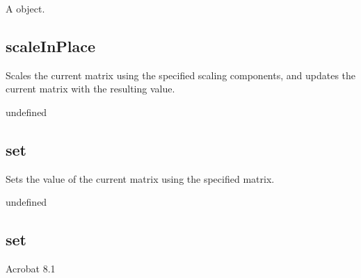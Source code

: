 \documentclass[letterpaper,12pt,english,openany,oneside]{sphinxmanual}
\begin{document}
\label{\detokenize{JS_3D_API:section-59}}\label{\detokenize{JS_3D_API:returns-54}}

A  object.


\subsection{scaleInPlace}
\label{\detokenize{JS_3D_API:scaleinplace}}
Scales the current matrix using the specified scaling components, and updates the current matrix with the resulting value.

\label{\detokenize{JS_3D_API:syntax-54}}

\begin{sphinxVerbatim}[commandchars=\\\{\}]
  
\end{sphinxVerbatim}
\label{\detokenize{JS_3D_API:parameters-41}}

\label{\detokenize{JS_3D_API:section-60}}\label{\detokenize{JS_3D_API:returns-55}}

undefined


\subsection{set}
\label{\detokenize{JS_3D_API:set-2}}\label{\detokenize{JS_3D_API:id13}}
Sets the value of the current matrix using the specified matrix.

\label{\detokenize{JS_3D_API:syntax-55}}

\begin{sphinxVerbatim}[commandchars=\\\{\}]
\end{sphinxVerbatim}
\label{\detokenize{JS_3D_API:parameters-42}}

\label{\detokenize{JS_3D_API:section-61}}\label{\detokenize{JS_3D_API:returns-56}}

undefined


\subsection{set}
\label{\detokenize{JS_3D_API:set-3}}\label{\detokenize{JS_3D_API:id14}}
Acrobat 8.1
\end{document}
